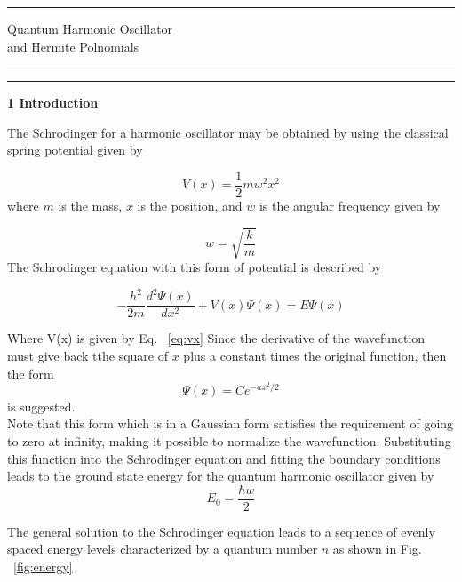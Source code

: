 \documentclass{article}
\begin{document}
\hrule
\begin{center}
\large {Quantum Harmonic Oscillator}\\ \large{and Hermite Polnomials}

\end{center}


\hrule
\vspace{1pt}
\hrule height 1pt

\vspace{.5cm}
\noindent\textbf{1  Introduction}
\vspace{.2cm}

\noindent The Schrodinger for a harmonic oscillator may be obtained by using
 the classical spring potential given by 

\begin{equation}
\label{eq:vx}
V(x)=\dfrac{1}{2}mw^2x^2
\end{equation}
where $m$ is the mass, $x$ is the position, and $w$ is the angular frequency
 given by 

\begin{equation}
\label{eq:w}
w=\sqrt{\frac{k}{m}}
\end{equation}
The Schrodinger equation with this form of potential is described by

\begin{equation}
\label{eq:Sch}
-\dfrac{h^2}{2m}\dfrac{d^2\Psi(x)}{dx^2}+V(x)\Psi(x) = E\Psi(x)
\end{equation}

Where V(x) is given by Eq. ~\eqref{eq:vx} Since the derivative of the
wavefunction must give back tthe square of $x$ plus a constant times the
original function, then the form
\begin{equation}
\label{eq:psiX}
\Psi(x)=Ce^{-ax^2/2}
\end{equation}
is suggested.
\\

Note that this form which is in a Gaussian form satisfies the requirement of going to zero at infinity, making it possible to normalize the wavefunction.  Substituting this function into the Schrodinger equation and fitting the boundary conditions leads to the ground state energy for the quantum harmonic oscillator given by
\begin{equation}
\label{eq:e0}
E_0= \dfrac{\hbar w}{2}
\end{equation}

The general solution to the Schrodinger equation leads to a sequence of 
evenly spaced energy levels characterized by a quantum number $n$ as shown in Fig. ~\ref{fig:energy}
\end{document}
